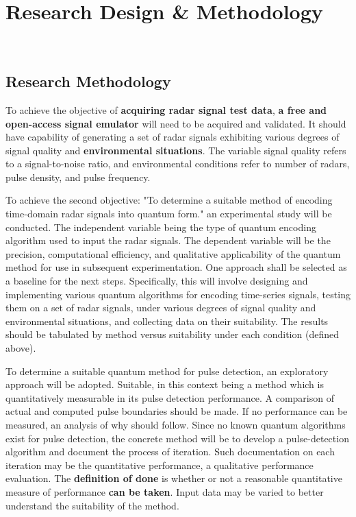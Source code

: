 \section{Research Design \& Methodology}~\label{sec:design}

\subsection{Research Methodology}

To achieve the objective of \textbf{acquiring radar signal test data}, \textbf{a free and open-access signal emulator} will need to be acquired and validated. 
It should have capability of  generating a set of radar signals exhibiting various degrees of signal quality and \textbf{environmental situations}. 
The variable signal quality refers to a signal-to-noise ratio, and environmental conditions refer to number of radars, pulse density, and pulse frequency.

To achieve the second objective: "To determine a suitable method of encoding time-domain radar signals into quantum form." an experimental study will be conducted. 
The independent variable being the type of quantum encoding algorithm used to input the radar signals. 
The dependent variable will be the precision, computational efficiency, and qualitative applicability of the quantum method for use in subsequent experimentation. 
One approach shall be selected as a baseline for the next steps. 
Specifically, this will involve designing and implementing various quantum algorithms for encoding time-series signals, testing them on a set of radar signals, under various degrees of signal quality and environmental situations, and collecting data on their suitability. 
The results should be tabulated by method versus suitability under each condition (defined above).

To determine a suitable quantum method for pulse detection, an exploratory approach will be adopted. Suitable, in this context being a method which is quantitatively measurable in its pulse detection performance. 
A comparison of actual and computed pulse boundaries should be made. 
If no performance can be measured, an analysis of why should follow. 
Since no known quantum algorithms exist for pulse detection, the concrete method will be to develop a pulse-detection algorithm and document the process of iteration. 
Such documentation on each iteration may be the quantitative performance, a qualitative performance evaluation. 
The \textbf{definition of done} is whether or not a reasonable quantitative measure of performance \textbf{can be taken}. Input data may be varied to better understand the suitability of the method.

